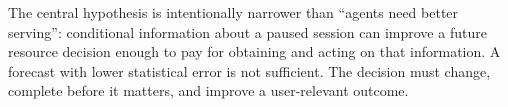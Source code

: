 The central hypothesis is intentionally narrower than ``agents need better
serving'': conditional information about a paused session can improve a future
resource decision enough to pay for obtaining and acting on that information.
A forecast with lower statistical error is not sufficient. The decision must
change, complete before it matters, and improve a user-relevant outcome.
